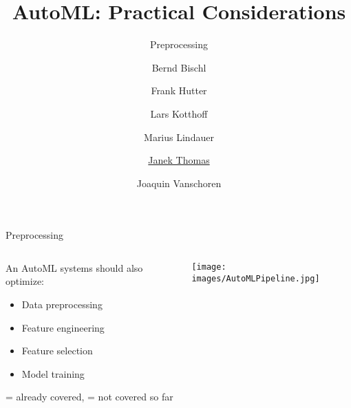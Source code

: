 

\usepackage[normalem]{ulem}
\usepackage{pifont}
\usepackage{relsize}
\renewcommand{\lit}[1]{{\smaller\color{black!60}[#1]}}
\title[AutoML: Practical]{AutoML: Practical Considerations} 
\subtitle{Preprocessing}
\author[Janek Thomas]{Bernd Bischl \and Frank Hutter \and Lars Kotthoff\newline \and Marius Lindauer \and \underline{Janek Thomas} \and Joaquin Vanschoren}



	
	\maketitle
	
	\begin{frame}[c]{Preprocessing}
		\begin{columns}
			\begin{column}{0.5\textwidth} 
				An AutoML systems should also optimize: 
				\begin{itemize}
					\item[\ding{55}] Data preprocessing
					\item[\ding{55}] Feature engineering
					\item[\ding{55}] Feature selection
					\item[\ding{51}] Model training
				\end{itemize}
				\vspace{1em}
				{\tiny {} = already covered,  = not covered so far}
			\end{column}%
			\begin{column}{0.5\textwidth}
				\begin{center}
					\texttt{[image: images/AutoMLPipeline.jpg]}  
				\end{center}
			\end{column}
		\end{columns}
		
	\end{frame}
	
